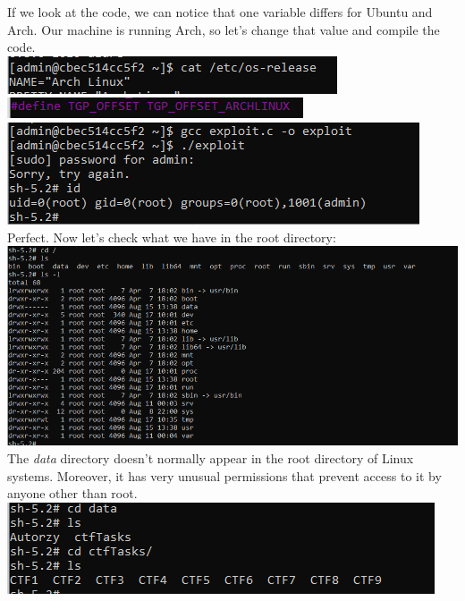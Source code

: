 \documentclass{article}
\begin{document}
If we look at the code, we can notice that one variable differs for Ubuntu and Arch. Our machine is running Arch, so let’s change that value and compile the code.
\vspace{3mm} \\
\includegraphics[width=\textwidth]{"image93.png"}
\vspace{3mm} \\
\includegraphics[width=\textwidth]{"image94.png"}
\vspace{3mm} \\
\includegraphics[width=\textwidth]{"image95.png"}
Perfect. Now let’s check what we have in the root directory:
\vspace{3mm} \\
\includegraphics[width=\textwidth]{"image96.png"}
The \textit{data} directory doesn’t normally appear in the root directory of Linux systems. Moreover, it has very unusual permissions that prevent access to it by anyone other than root.
\vspace{3mm} \\
\includegraphics[width=\textwidth]{"image97.png"}
\end{document}
